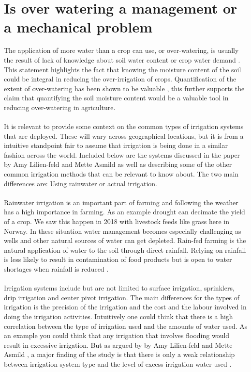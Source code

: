 \documentclass[]{uiophd}
\begin{document}
\section{Is over watering a management or a mechanical problem}
 The application of more water than a crop can use, or over-watering, is usually the result of lack of knowledge about soil water content or crop water demand \cite{LILIENFELD200773}. This statement highlights the fact that knowing the moisture content of the soil could be integral in reducing the over-irrigation of crops. Quantification of the extent of over-watering has been shown to be valuable \cite{LILIENFELD200773}, this further supports the claim that quantifying the soil moisture content would be a valuable tool in reducing over-watering in agriculture. 
\\\\
It is relevant to provide some context on the common types of irrigation systems that are deployed. These will wary across geographical locations, but it is from a intuitive standpoint fair to assume that irrigation is being done in a similar fashion across the world. Included below are the systems discussed in the paper by Amy Lilien-feld and Mette Asmild \cite{LILIENFELD200773} as well as describing some of the  other common irrigation methods that can be relevant to know about. The two main differences are: Using rainwater or actual irrigation. 
\\\\
Rainwater irrigation is an important part of farming and following the weather has a high importance in farming. As an example drought can decimate the yield of a crop. We saw this happen in 2018 with livestock feeds like grass here in Norway. In these situation water management becomes especially challenging as wells and other natural sources of water can get depleted. Rain-fed farming is the natural application of water to the soil through direct rainfall. Relying on rainfall is less likely to result in contamination of food products but is open to water shortages when rainfall is reduced \cite{cdc}.
\\\\
Irrigation systems include but are not limited to surface irrigation, sprinklers, drip irrigation and center pivot irrigation. The main differences for the types of irrigation is the precision of the irrigation and the cost and the labour involved in doing the irrigation activities. Intuitively one could think that there is a high correlation between the type of irrigation used and the amounts of water used. As an example you could think that any irrigation that involves flooding would result in excessive irrigation. But as argued by by Amy Lilien-feld and Mette Asmild \cite{LILIENFELD200773}, a major finding of the study is that there is only a weak relationship between irrigation system type and the level of excess irrigation water used \cite{LILIENFELD200773}.
\end{document}
